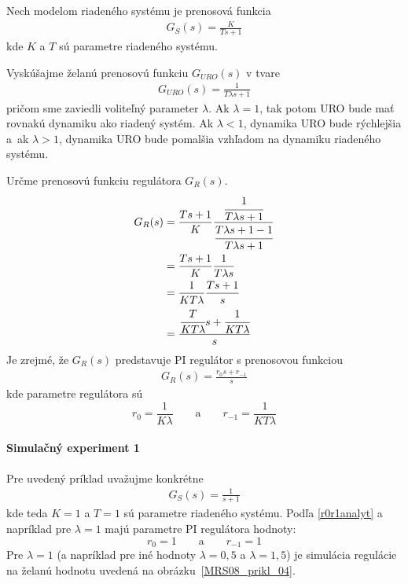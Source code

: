 \documentclass[a4paper, 10pt, ]{article}
\begin{document}
Nech modelom riadeného systému je prenosová funkcia
\begin{align}
    G_S(s) = \frac{K}{Ts+1}
\end{align}
kde $K$ a $T$ sú parametre riadeného systému.

Vyskúšajme želanú prenosovú funkciu $G_{URO}(s)$ v tvare
\begin{align}
    G_{URO}(s) = \frac{1}{T \lambda s + 1}
\end{align}
pričom sme zaviedli voliteľný parameter $\lambda$. Ak $\lambda = 1$, tak potom URO bude mať rovnakú dynamiku ako riadený systém. Ak $\lambda < 1$, dynamika URO bude rýchlejšia a~ak $\lambda > 1$, dynamika URO bude pomalšia vzhľadom na dynamiku riadeného systému.

Určme prenosovú funkciu regulátora $G_R(s)$.
\begin{equation} 
    \begin{aligned}
        G_R(s)  &= \frac{Ts+1}{K} \frac{ \cfrac{1}{T \lambda s + 1}   }{  \cfrac{T \lambda s + 1 - 1}{T \lambda s + 1}  }  \\
        &=   \frac{Ts+1}{K} \frac{1}{T \lambda s} \\
        &= \frac{1}{K T \lambda} \frac{Ts+1}{s} \\
        &= \frac{  \cfrac{T}{K T \lambda} s + \cfrac{1}{K T \lambda}  }{ s }
    \end{aligned}
\end{equation}
Je zrejmé, že $G_R(s)$ predstavuje PI regulátor s prenosovou funkciou
\begin{align}
    G_R(s) = \frac{r_0 s + r_{-1}}{s}
\end{align}
kde parametre regulátora sú
\begin{equation} \label{r0r1analyt}
    r_0 = \frac{1}{K \lambda} \qquad \text{a} \qquad r_{-1} = \frac{1}{K T \lambda}
\end{equation}





\paragraph{Simulačný experiment 1}

Pre uvedený príklad uvažujme konkrétne
\begin{align}
    G_S(s) = \frac{1}{s+1}
\end{align}
kde teda $K=1$ a $T=1$ sú parametre riadeného systému. Podľa \eqref{r0r1analyt} a napríklad pre $\lambda = 1$ majú parametre PI regulátora hodnoty:
\begin{equation} \label{r0r1analyt1}
    r_0 = 1 \qquad \text{a} \qquad r_{-1} = 1
\end{equation}
Pre $\lambda = 1$ (a napríklad pre iné hodnoty $\lambda = 0,5$ a $\lambda = 1,5$) je simulácia regulácie na želanú hodnotu uvedená na obrázku~\ref{MRS08_prikl_04}.
\end{document}
